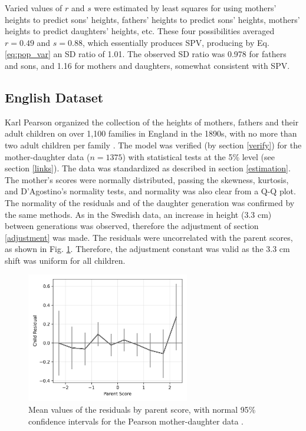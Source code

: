 \documentclass{svproc} %
\begin{document}
Varied values of $r$ and $s$ were estimated by least squares for using mothers' heights to predict sons' heights, fathers' heights to predict sons' heights, mothers' heights to predict daughters' heights, etc. These four possibilities averaged $r = 0.49$ and $s = 0.88$, which essentially produces SPV, producing by Eq. \ref{eq:pop_var} an SD ratio of 1.01. The observed SD ratio was 0.978 for fathers and sons, and 1.16 for mothers and daughters, somewhat consistent with SPV. 


\subsection{English Dataset} \label{pearson}

Karl Pearson organized the collection of the heights of mothers, fathers and their adult children on over 1,100 families in England in the 1890s, with no more than two adult children per family \cite{pearson}. The model was verified (by section \ref{verify}) for the mother-daughter data ($n = 1375$) with statistical tests at the 5\% level (see section \ref{links}). The data was standardized as described in section \ref{estimation}. The mother's scores were normally distributed, passing the skewness, kurtosis, and D’Agostino's normality tests, and normality was also clear from a Q-Q plot. The normality of the residuals and of the daughter generation was confirmed by the same methods. As in the Swedish data, an increase in height (3.3 cm) between generations was observed, therefore the adjustment of section \ref{adjustment} was made. The residuals were uncorrelated with the parent scores, as shown in Fig. \ref{fig:pearson_residuals_by_score}. Therefore, the adjustment constant was valid as the 3.3 cm shift was uniform for all children. 

\begin{figure}[h]
\includegraphics[width=2.8in]{figures/pearson-lee-mother-daughter-residuals_by_parent.png}
\centering
\caption{Mean values of the residuals by parent score, with normal 95\% confidence intervals for the Pearson mother-daughter data \cite{pearson}.}
\label{fig:pearson_residuals_by_score}
\end{figure}
\end{document}

